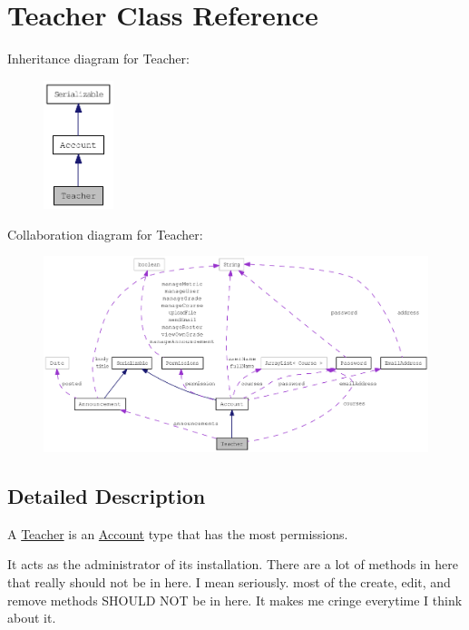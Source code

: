 \hypertarget{classTeacher}{
\section{Teacher Class Reference}
\label{classTeacher}
}
Inheritance diagram for Teacher:\nopagebreak
\begin{figure}[H]
\begin{center}
\leavevmode
\includegraphics[width=58pt]{classTeacher__inherit__graph}
\end{center}
\end{figure}
Collaboration diagram for Teacher:\nopagebreak
\begin{figure}[H]
\begin{center}
\leavevmode
\includegraphics[width=400pt]{classTeacher__coll__graph}
\end{center}
\end{figure}


\subsection{Detailed Description}
A \hyperlink{classTeacher}{Teacher} is an \hyperlink{classAccount}{Account} type that has the most permissions. 

It acts as the administrator of its installation. There are a lot of methods in here that really should not be in here. I mean seriously. most of the create, edit, and remove methods SHOULD NOT be in here. It makes me cringe everytime I think about it.

